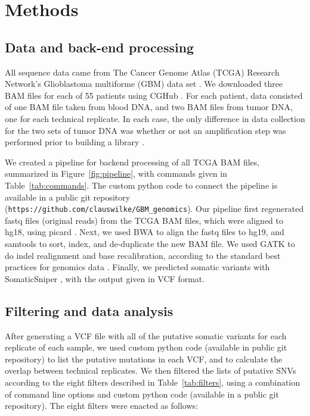 \documentclass[11pt]{article} %
\begin{document}
\section*{Methods}

\subsection*{Data and back-end processing}

All sequence data came from The Cancer Genome Atlas (TCGA) Research Network's Glioblastoma multiforme (GBM) data set \citep{TCGA-GBM}. We downloaded three BAM files for each of 55 patients using CGHub \citep{CGHub}. For each patient, data consisted of one BAM file taken from blood DNA, and two BAM files from tumor DNA, one for each technical replicate. In each case, the only difference in data collection for the two sets of tumor DNA was whether or not an amplification step was performed prior to building a library \citep{TCGA-GBM}. 

We created a pipeline for backend processing of all TCGA BAM files, summarized in Figure~\ref{fig:pipeline}, with commands given in Table~\ref{tab:commands}. The custom python code to connect the pipeline is available in a public 
git repository (\texttt{https://github.com/clauswilke/GBM\_genomics}). Our pipeline first regenerated fastq files (original reads) from the TCGA BAM files, which were aligned to hg18, using picard \citep{picard}. Next, we used BWA \citep{bwa} to align the fastq files to hg19, and samtools \citep{SAMtools} to sort, index, and de-duplicate the new BAM file. We used GATK \citep{GATK} to do indel realignment and base recalibration, according to the standard best practices for genomics data \citep{best-practices}. Finally, we predicted somatic variants with SomaticSniper \citep{SomaticSniper}, with the output given in VCF format.

\subsection*{Filtering and data analysis}

After generating a VCF file with all of the putative somatic variants for each replicate of each sample, we used custom python code (available in public git repository) to list the putative mutations in each VCF, and to calculate the overlap between technical replicates. We then filtered the lists of putative SNVs according to the eight filters described in Table~\ref{tab:filters}, using a combination of command line options and custom python code (available in a public git repository). The eight filters were enacted as follows: 
\end{document}
